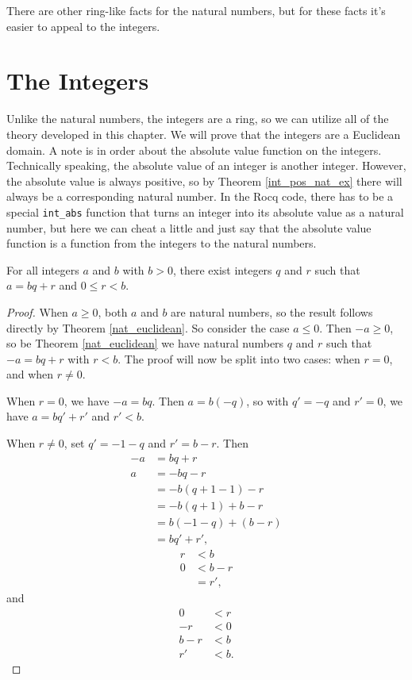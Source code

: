 \documentclass[../../math.tex]{subfiles}
\begin{document}
There are other ring-like facts for the natural numbers, but for these facts
it's easier to appeal to the integers.

\section{The Integers}

Unlike the natural numbers, the integers are a ring, so we can utilize all of
the theory developed in this chapter.  We will prove that the integers are a
Euclidean domain.  A note is in order about the absolute value function on the
integers.  Technically speaking, the absolute value of an integer is another
integer.  However, the absolute value is always positive, so by Theorem
\ref{int_pos_nat_ex} there will always be a corresponding natural number.  In
the Rocq code, there has to be a special \verb|int_abs| function that turns an
integer into its absolute value as a natural number, but here we can cheat a
little and just say that the absolute value function is a function from the
integers to the natural numbers.

\begin{lemma} \label{int_div_pos}
    For all integers $a$ and $b$ with $b > 0$, there exist integers $q$ and $r$
    such that $a = bq + r$ and $0 \leq r < b$.
\end{lemma}
\begin{proof}
    When $a \geq 0$, both $a$ and $b$ are natural numbers, so the result follows
    directly by Theorem \ref{nat_euclidean}.  So consider the case $a \leq 0$.
    Then $-a \geq 0$, so be Theorem \ref{nat_euclidean} we have natural numbers
    $q$ and $r$ such that $-a = bq + r$ with $r < b$.  The proof will now be
    split into two cases: when $r = 0$, and when $r \neq 0$.

    When $r = 0$, we have $-a = bq$.  Then $a = b(-q)$, so with $q' = -q$ and
    $r' = 0$, we have $a = bq' + r'$ and $r' < b$.

    When $r \neq 0$, set $q' = -1 - q$ and $r' = b - r$.  Then
    \begin{align*}
        -a &= bq + r \\
        a &= -bq - r \\
          &= -b(q + 1 - 1) - r \\
          &= -b(q + 1) + b - r \\
          &= b(-1 - q) + (b - r) \\
          &= bq' + r',
    \end{align*}
    \begin{align*}
        r &< b \\
        0 &< b - r \\
          &= r',
    \end{align*}
    and
    \begin{align*}
        0 &< r \\
        -r &< 0 \\
        b - r &< b \\
        r' &< b.
    \end{align*}
\end{proof}
\end{document}
